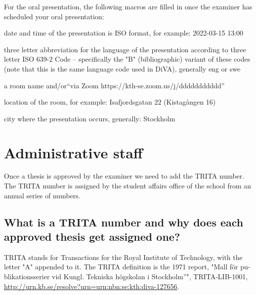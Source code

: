 For the oral presentation, the following macros are filled in once the examiner has scheduled your oral presentation:
\begin{description}[leftmargin=!, labelwidth =\widthof{\texttt{\textbackslash presentationDateAndTimeISO\{\}}}]
\item [\texttt{\textbackslash presentationDateAndTimeISO\{\}}] date and time of the presentation is ISO format, for example: 2022-03-15 13:00
\item [\texttt{\textbackslash presentationLanguage\{\}}] three letter abbreviation for the language of the presentation according to three letter ISO 639-2 Code – specifically the "B" (bibliographic) variant of these codes (note that this is the same language code used in DiVA), generally eng or swe
\item [\texttt{\textbackslash presentationRoom\{\}}] a room name and/or\hspace*{\fill}\linebreak[4] ``via Zoom https://kth-se.zoom.us/j/ddddddddddd''
\item [\texttt{\textbackslash presentationAddress\{\}}] location of the room, for example: Isafjordsgatan 22 (Kistagången 16)
\item [\texttt{\textbackslash presentationCity\{\}}] city where the presentation occurs, generally: Stockholm
\end{description}


\section{Administrative staff}
\label{sec:adminStaff}

Once a thesis is approved by the examiner we need to add the TRITA number. The TRITA number is assigned by the student affairs office of the school from an annual series of numbers.

\subsection{What is a TRITA number and why does each approved thesis get assigned one?}

TRITA stands for Transactions for the Royal Institute of Technology, with the letter "A" appended to it. The TRITA definition is the 1971 report, "\foreignlanguage{swedish}{Mall för publikationsserier vid Kungl. Tekniska högskolan i Stockholm}''", TRITA-LIB-1001, \url{http://urn.kb.se/resolve?urn=urn:nbn:se:kth:diva-127656}.

